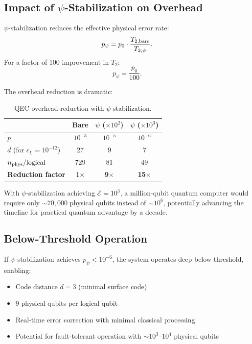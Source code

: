 \documentclass[aps,prd,twocolumn,superscriptaddress,nofootinbib]{revtex4-2}
\begin{document}
\subsection{Impact of $\psi$-Stabilization on Overhead}

$\psi$-stabilization reduces the effective physical error rate:
\begin{equation}
p_\psi = p_0 \cdot \frac{T_{2,\rm bare}}{T_{2,\psi}}.
\end{equation}
For a factor of 100 improvement in $T_2$:
\begin{equation}
p_\psi = \frac{p_0}{100}.
\end{equation}

The overhead reduction is dramatic:

\begin{table}[h]
\caption{QEC overhead reduction with $\psi$-stabilization.}
\label{tab:qec}
\begin{ruledtabular}
\begin{tabular}{lccc}
& \textbf{Bare} & \textbf{$\psi$ ($\times 10^2$)} & \textbf{$\psi$ ($\times 10^3$)} \\
\hline
$p$ & $10^{-3}$ & $10^{-5}$ & $10^{-6}$ \\
$d$ (for $\epsilon_L = 10^{-12}$) & 27 & 9 & 7 \\
$n_{\rm phys}/{\rm logical}$ & 729 & 81 & 49 \\
\textbf{Reduction factor} & 1$\times$ & \textbf{9$\times$} & \textbf{15$\times$} \\
\end{tabular}
\end{ruledtabular}
\end{table}

With $\psi$-stabilization achieving $\mathcal{E} = 10^3$, a million-qubit
quantum computer would require only $\sim 70{,}000$ physical qubits
instead of $\sim 10^6$, potentially advancing the timeline for practical
quantum advantage by a decade.

\subsection{Below-Threshold Operation}

If $\psi$-stabilization achieves $p_\psi < 10^{-6}$, the system operates
deep below threshold, enabling:
\begin{itemize}
\item Code distance $d = 3$ (minimal surface code)
\item 9 physical qubits per logical qubit
\item Real-time error correction with minimal classical processing
\item Potential for fault-tolerant operation with $\sim 10^3$--$10^4$
physical qubits
\end{itemize}
\end{document}
